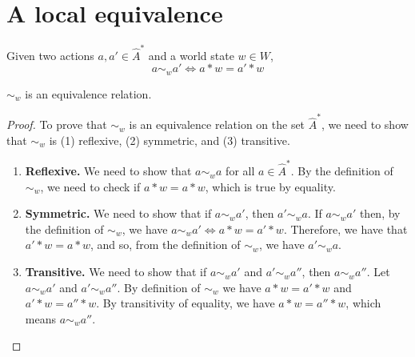\section{
A local equivalence
}

\begin{definition}
	Given two actions $a, a' \in \hat{A}^{*}$ and a world state $w \in W$,
	\begin{equation}
		a \sim_{w} a' \iff a \ast w = a' \ast w
	\end{equation}
\end{definition}

\begin{proposition}
    $\sim_{w}$ is an equivalence relation.
\end{proposition}
\begin{proof}
    To prove that $\sim_{w}$ is an equivalence relation on the set $\hat{A}^{*}$, we need to show that $\sim_{w}$ is (1) reflexive, (2) symmetric, and (3) transitive.
    \begin{enumerate}[(1)]
        \item \textbf{Reflexive.}
        We need to show that $a \sim_{w} a$ for all $a \in \hat{A}^{*}$.
        By the definition of $\sim_{w}$, we need to check if $a \ast w = a \ast w$, which is true by equality.

        \item \textbf{Symmetric.}
        We need to show that if $a \sim_{w} a'$, then $a' \sim_{w} a$.
        If $a \sim_{w} a'$ then, by the definition of $\sim_{w}$, we have $a \sim_{w} a' \iff a \ast w = a' \ast w$.
        Therefore, we have that $a' \ast w = a \ast w$, and so, from the definition of $\sim_{w}$, we have $a' \sim_{w} a$.

        \item \textbf{Transitive.}
        We need to show that if $a \sim_{w} a'$ and $a' \sim_{w} a''$, then $a \sim_{w} a''$.
        Let $a \sim_{w} a'$ and $a' \sim_{w} a''$.
        By definition of $\sim_{w}$ we have $a \ast w = a' \ast w$ and $a' \ast w = a'' \ast w$.
        By transitivity of equality, we have $a \ast w = a'' \ast w$, which means $a \sim_{w} a''$.
    \end{enumerate}
\end{proof}

